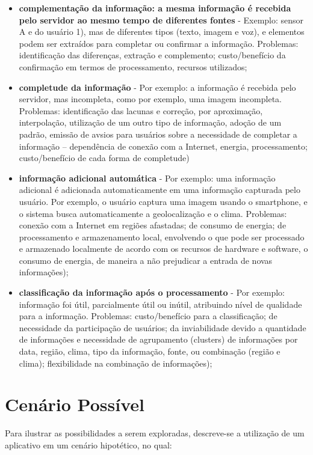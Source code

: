 \begin{itemize}
\begin{itemize}
			\item \textbf{complementação da informação: a mesma informação é recebida pelo servidor ao mesmo tempo de diferentes fontes} - Exemplo: sensor A e do usuário 1), mas de diferentes tipos (texto, imagem e voz), e elementos podem ser extraídos para completar ou confirmar a informação. Problemas: identificação das diferenças, extração e complemento; custo/benefício da  confirmação em termos de processamento, recursos utilizados;
			\item \textbf{completude da informação} - Por exemplo: a informação é recebida pelo servidor, mas incompleta, como por exemplo, uma imagem incompleta. Problemas: identificação das lacunas e correção, por aproximação, interpolação, utilização de um outro tipo de informação, adoção de um padrão, emissão de avsios para usuários sobre a necessidade de completar a informação – dependência de conexão com a Internet, energia, processamento; custo/benefício de cada forma de completude)
			\item \textbf{informação adicional automática} - Por exemplo: uma informação adicional é adicionada automaticamente em uma informação capturada pelo usuário. Por exemplo, o usuário captura uma imagem usando o smartphone, e o sistema busca automaticamente a geolocalização e o clima. Problemas: conexão com a Internet em regiões afastadas; de consumo de energia; de processamento e armazenamento local, envolvendo o que pode ser processado e armazenado localmente de acordo com os recursos de hardware e software, o consumo de energia, de maneira a não prejudicar a entrada de novas informações);
			\item \textbf{classificação da informação após o processamento} - Por exemplo: informação foi útil, parcialmente útil ou inútil, atribuindo nível de qualidade para a informação. Problemas: custo/benefício para a classificação; de necessidade da participação de usuários; da inviabilidade devido a quantidade de informações e necessidade de agrupamento (clusters) de informações por data, região, clima, tipo da informação, fonte, ou combinação (região e clima); flexibilidade na combinação de informações);
		\end{itemize}
\end{itemize}

\section{Cenário Possível}
\label{ape:cenario_possivel}

Para ilustrar as possibilidades a serem exploradas, descreve-se a utilização de um aplicativo em um cenário hipotético, no qual:

